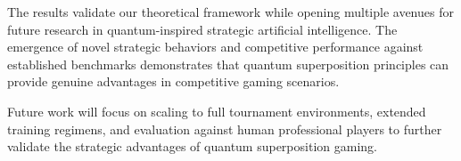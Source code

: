 \documentclass[11pt,a4paper]{article}
\begin{document}
The results validate our theoretical framework while opening multiple avenues for future research in quantum-inspired strategic artificial intelligence. The emergence of novel strategic behaviors and competitive performance against established benchmarks demonstrates that quantum superposition principles can provide genuine advantages in competitive gaming scenarios.

Future work will focus on scaling to full tournament environments, extended training regimens, and evaluation against human professional players to further validate the strategic advantages of quantum superposition gaming.



\end{document}
